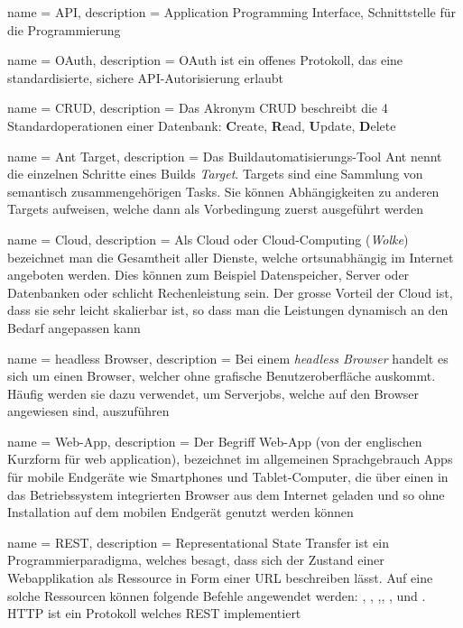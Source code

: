  {
	name = API,
	description = {Application Programming Interface, Schnittstelle für die Programmierung}
}

 {
	name = OAuth,
	description = {OAuth ist ein offenes Protokoll, das eine standardisierte, sichere API-Autorisierung erlaubt\cite{oauth}}
}

 {
	name = CRUD,
	description = {Das Akronym CRUD beschreibt die 4 Standardoperationen einer Datenbank: \textbf{C}reate, \textbf{R}ead, \textbf{U}pdate, \textbf{D}elete\cite{crud}}
}

 {
	name = Ant Target,
	description = {Das Buildautomatisierungs-Tool Ant nennt die einzelnen Schritte eines Builds \emph{Target}. Targets sind eine Sammlung von semantisch zusammengehörigen Tasks. Sie können Abhängigkeiten zu anderen Targets aufweisen, welche dann als Vorbedingung zuerst ausgeführt werden\cite{ant-target}}
}

 {
	name = Cloud,
	description = {Als Cloud oder Cloud-Computing (\emph{Wolke}) bezeichnet man die Gesamtheit aller Dienste, welche ortsunabhängig im Internet angeboten werden. Dies können zum Beispiel Datenspeicher, Server oder Datenbanken oder schlicht Rechenleistung sein. Der grosse Vorteil der Cloud ist, dass sie sehr leicht skalierbar ist, so dass man  die Leistungen dynamisch an den Bedarf angepassen kann\cite{cloud}}
}

 {
	name = headless Browser,
	description = {Bei einem \emph{headless Browser} handelt es sich um einen Browser, welcher ohne grafische Benutzeroberfläche auskommt. Häufig werden sie dazu verwendet, um Serverjobs, welche auf den Browser angewiesen sind, auszuführen}
}

 {
	name = Web-App,
	description = {Der Begriff Web-App (von der englischen Kurzform für web application), bezeichnet im allgemeinen Sprachgebrauch Apps für mobile Endgeräte wie Smartphones und Tablet-Computer, die über einen in das Betriebssystem integrierten Browser aus dem Internet geladen und so ohne Installation auf dem mobilen Endgerät genutzt werden können\cite{webapp}}
}

 {
	name = REST,
	description = {Representational State Transfer\cite{rest} ist ein Programmierparadigma, welches besagt, dass sich der Zustand einer Webapplikation als Ressource in Form einer URL beschreiben lässt. Auf eine solche Ressourcen können folgende Befehle angewendet werden: , , ,, ,  und . 
	HTTP ist ein Protokoll welches REST implementiert}
}

